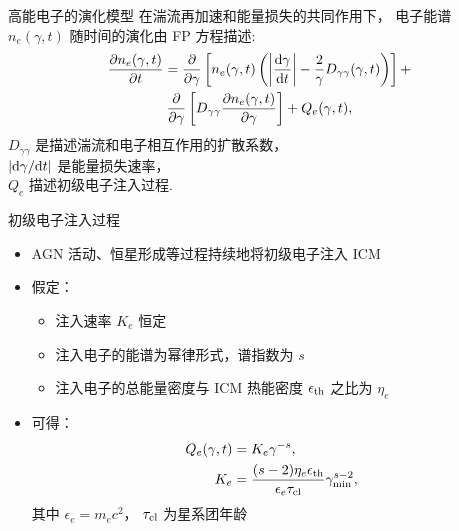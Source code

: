 \documentclass{beamer}
\begin{document}
\begin{frame}{高能电子的演化模型}
  在\alert{湍流再加速}和\alert{能量损失}的共同作用下，
  电子能谱 $n_e(\gamma, t)$ 随时间的演化由 \alert{FP 方程}描述:
  \begin{multline}
    \frac{\partial n_e(\gamma, t)}{\partial t} =
      \frac{\partial }{\partial \gamma} \left[ n_e(\gamma, t) \left(
        \left| \frac{\text{d}\gamma}{\text{d}t} \right| -
        \frac{2}{\gamma} D_{\gamma\gamma}(\gamma, t) \right) \right] + \\
      \frac{\partial }{\partial \gamma} \left[
      D_{\gamma\gamma} \frac{\partial n_e(\gamma, t)}{\partial \gamma} \right]
      + Q_e(\gamma, t) ,
  \end{multline}
  $D_{\gamma\gamma}$ 是描述湍流和电子相互作用的扩散系数，\\
  $|\text{d}\gamma / \text{d}t|$ 是能量损失速率，\\
  $Q_e$ 描述初级电子注入过程.
\end{frame}

\begin{frame}
  \begin{alertblock}{初级电子注入过程}
    \smallskip
    \begin{itemize}
      \item AGN 活动、恒星形成等过程持续地将初级电子注入 ICM
      \item 假定：
        \begin{itemize}
          \item 注入速率 $K_e$ 恒定
          \item 注入电子的能谱为幂律形式，谱指数为 $s$
          \item 注入电子的总能量密度与 ICM 热能密度 $\epsilon_{\text{th}}$
            之比为 $\eta_e$
        \end{itemize}
      \item 可得：
        \begin{align}
          Q_e(\gamma, t) & = K_e \gamma^{-s} , \\
          K_e & = \frac{(s-2) \eta_e \epsilon_{\text{th}}}{
            \epsilon_e \tau_{\text{cl}}} \gamma_{\text{min}}^{s-2} ,
        \end{align}
        其中 $\epsilon_e = m_e c^2$，
        $\tau_{\text{cl}}$ 为星系团年龄
    \end{itemize}
  \end{alertblock}
\end{frame}
\end{document}
